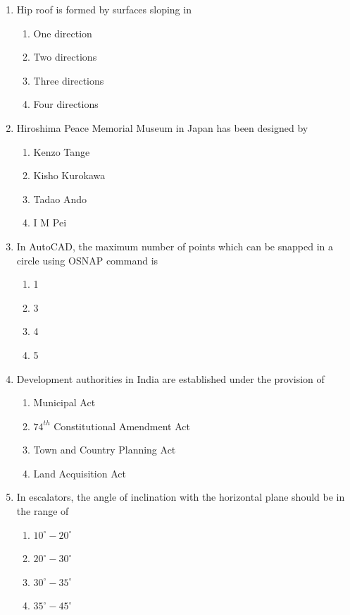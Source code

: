 \documentclass[journal,12pt,onecolumn]{IEEEtran}
\theoremstyle{remark}
\begin{document}
\begin{enumerate}
\item Hip roof is formed by surfaces sloping in

\hfill{}
\begin{enumerate}
\item One direction
\item Two directions
\item Three directions
\item Four directions
\end{enumerate}

\item Hiroshima Peace Memorial Museum in Japan has been designed by
\begin{enumerate}
\item Kenzo Tange
\item Kisho Kurokawa
\item Tadao Ando
\item I M Pei
\end{enumerate}

\item In AutoCAD, the maximum number of points which can be snapped in a circle using OSNAP command is

\hfill{}
\begin{enumerate}
\item 1
\item 3
\item 4
\item 5
\end{enumerate}

\item Development authorities in India are established under the provision of

\hfill{}
\begin{enumerate}
\item Municipal Act
\item $74^{th}$ Constitutional Amendment Act
\item Town and Country Planning Act
\item Land Acquisition Act
\end{enumerate}

\item In escalators, the angle of inclination with the horizontal plane should be in the range of

\hfill{}
\begin{enumerate}
\item $10^\circ-20^\circ$
\item $20^\circ-30^\circ$
\item $30^\circ-35^\circ$
\item $35^\circ-45^\circ$
\end{enumerate}


\end{enumerate}
\end{document}
